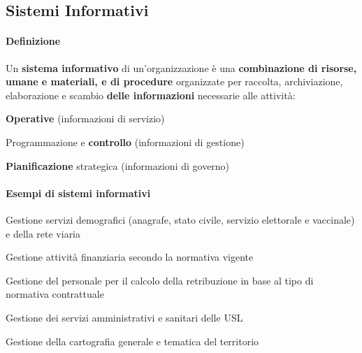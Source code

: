 \documentclass[10pt]{book}
\begin{document}
\subsection{Sistemi Informativi}
\paragraph{Definizione} Un \textbf{sistema informativo} di un'organizzazione è una \textbf{combinazione di risorse, umane e materiali, e di procedure} organizzate per raccolta, archiviazione, elaborazione e scambio \textbf{delle informazioni} necessarie alle attività:
\begin{list}{}{}
	\item \textbf{Operative} (informazioni di servizio)
	\item Programmazione e \textbf{controllo} (informazioni di gestione)
	\item \textbf{Pianificazione} strategica (informazioni di governo)
\end{list}
\pagebreak
\paragraph{Esempi di sistemi informativi}
\begin{list}{}{Un comune}
	\item Gestione servizi demografici (anagrafe, stato civile, servizio elettorale e vaccinale) e della rete viaria
	\item Gestione attività finanziaria secondo la normativa vigente
	\item Gestione del personale per il calcolo della retribuzione in base al tipo di normativa contrattuale
	\item Gestione dei servizi amministrativi e sanitari delle USL
	\item Gestione della cartografia generale e tematica del territorio
\end{list}
\end{document}
